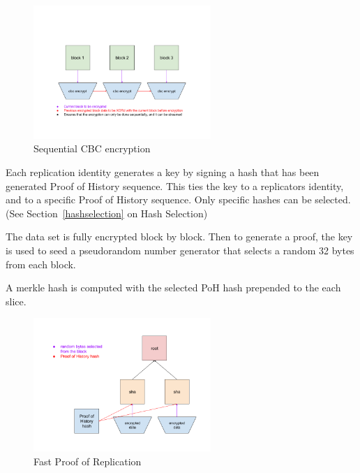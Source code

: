 \documentclass[12pt]{article}
\begin{document}
\begin{figure}
  \begin{center}
    \centering
    \includegraphics[width=0.6\textwidth]{figures/fig_7.png}
    \caption[Fig 7]{Sequential CBC encryption\label{fig:encrypt}}
  \end{center}
  \end{figure}

Each replication identity generates a key by signing a hash that has been generated Proof of History sequence. This ties the key to a replicators identity, and to a specific Proof of History sequence. Only specific hashes can be selected. (See Section~\ref{hashselection} on Hash Selection)

The data set is fully encrypted block by block. Then to generate a proof, the key is used to seed a pseudorandom number generator that selects a random 32 bytes from each block.

A merkle hash is computed with the selected PoH hash prepended to the each slice.

\begin{figure}
  \begin{center}
    \centering
    \includegraphics[width=0.6\textwidth]{figures/fig_8.png}
    \caption[Fig 8]{Fast Proof of Replication\label{fig_8}}
  \end{center}
  \end{figure}
\end{document}
